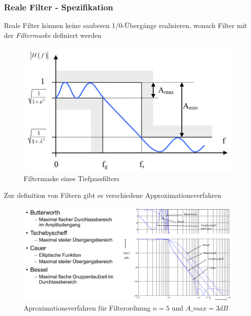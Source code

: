 \documentclass[
  10pt,
  a4paper,
  german]{article}
\numberwithin{equation}{section}
\begin{document}
\hypertarget{reale-filter---spezifikation}{%
\subsubsection{Reale Filter -
Spezifikation}\label{reale-filter---spezifikation}}

Reale Filter können keine sauberen 1/0-Übergänge realisieren, wonach
Filter mit der \emph{Filtermaske} definiert werden

\begin{figure}[H]

{\centering \includegraphics{images/03_Filtermaske.png}

}

\caption{Filtermaske eines Tiefpassfilters}

\end{figure}

Zur definition von Filtern gibt es verschiedene Approximationsverfahren

\begin{figure}[H]

{\centering \includegraphics{images/03_Approximationsverfahren.png}

}

\caption{Aproximationsverfahren für Filterordnung \(n=5\) und
\(A\_{max}=3dB\)}

\end{figure}
\end{document}
